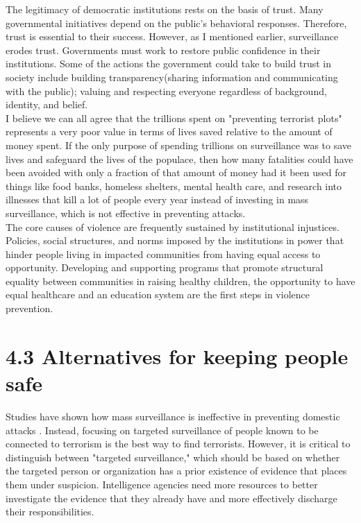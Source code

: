 \documentclass[11pt]{report}
\begin{document}
The legitimacy of democratic institutions rests on the basis of trust. Many governmental initiatives depend on the public's behavioral responses. Therefore, trust is essential to their success. However, as I mentioned earlier, surveillance erodes trust. Governments must work to restore public confidence in their institutions. Some of the actions the government could take to build trust in society include building transparency(sharing information and communicating with the public); valuing and respecting everyone regardless of background, identity, and belief.\\

I believe we can all agree that the trillions spent on "preventing terrorist plots" represents a very poor value in terms of lives saved relative to the amount of money spent. If the only purpose of spending trillions on surveillance was to save lives and safeguard the lives of the populace, then how many fatalities could have been avoided with only a fraction of that amount of money had it been used for things like food banks, homeless shelters, mental health care, and research into illnesses that kill a lot of people every year instead of investing in mass surveillance, which is not effective in preventing attacks.\\

The core causes of violence are frequently sustained by institutional injustices. Policies, social structures, and norms imposed by the institutions in power that hinder people living in impacted communities from having equal access to opportunity. Developing and supporting programs that promote structural equality between communities in raising healthy children, the opportunity to have equal healthcare and an education system are the first steps in violence prevention.\\

\section*{4.3 Alternatives for keeping people safe}

Studies have shown how mass surveillance is ineffective in preventing domestic attacks \cite{granick_2017}. Instead, focusing on targeted surveillance of people known to be connected to terrorism is the best way to find terrorists. However, it is critical to distinguish between "targeted surveillance," which should be based on whether the targeted person or organization has a prior existence of evidence that places them under suspicion. Intelligence agencies need more resources to better investigate the evidence that they already have and more effectively discharge their responsibilities. \\
\end{document}
